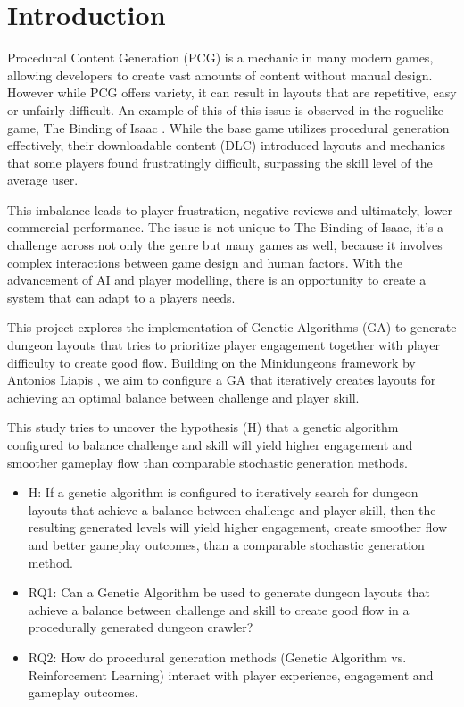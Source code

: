 \section{Introduction}


Procedural Content Generation (PCG) is a mechanic in many modern games, allowing developers to create
vast amounts of content without manual design. However while PCG offers variety, it can result in layouts
that are repetitive, easy or unfairly difficult. An example of this of this issue is observed in the roguelike game,
The Binding of Isaac \cite{TheBindingOfIsaac}. While the base game utilizes procedural generation effectively, their downloadable content (DLC)
introduced layouts and mechanics that some players found frustratingly difficult, surpassing the skill level
of the average user. 

This imbalance leads to player frustration, negative reviews and ultimately, lower commercial 
performance. The issue is not unique to The Binding of Isaac, it's a challenge across not only the genre 
but many games as well, because it involves complex interactions between game design and human factors. With
the advancement of AI and player modelling, there is an opportunity to create a system that can adapt to a players needs.

This project explores the implementation of Genetic Algorithms (GA) to generate dungeon layouts that 
tries to prioritize player engagement together with player difficulty to create good flow. Building on the Minidungeons
framework by Antonios Liapis \cite{liapis_minidungeons}, we aim to configure a GA that iteratively creates 
layouts for achieving an optimal balance between challenge and player skill.

This study tries to uncover the hypothesis (H) that a genetic algorithm configured 
to balance challenge and skill will yield higher engagement and smoother gameplay flow than comparable
stochastic generation methods.

\begin{itemize}
	\item H: If a genetic algorithm is configured to iteratively search for dungeon layouts that achieve a balance between 
	challenge and player skill, then the resulting generated levels will yield higher engagement, create smoother flow and
	better gameplay outcomes, than a comparable stochastic generation method.
	\item RQ1: Can a Genetic Algorithm be used to generate dungeon layouts that achieve a 
	balance between challenge and skill to create good flow in a procedurally generated dungeon crawler?
	\item RQ2: How do procedural generation methods (Genetic Algorithm vs. Reinforcement Learning) 
	interact with player experience, engagement and gameplay outcomes.
\end{itemize}
